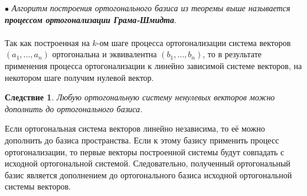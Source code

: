$\bullet$ \textit{Алгоритм построения ортогонального базиса из теоремы выше называется \textbf{процессом ортогонализации Грама-Шмидта}}.\\\\
Так как построенная на $k$-ом шаге процесса ортогонализации система векторов $(a_1,\dots,a_n)$ ортогональна и эквивалентна $(b_1, \dots, b_n)$, то в результате применения
процесса ортогонализации к линейно зависимой системе векторов, на некотором шаге получим нулевой вектор.
\newtheorem*{cor14_2_1}{Следствие}\begin{cor14_2_1}Любую ортогональную систему ненулевых векторов можно дополнить до ортогонального базиса.
\end{cor14_2_1}\begin{Proof}
	Если ортогональная система векторов линейно независима, то её можно дополнить до базиса пространства. Если к этому базису применить процесс ортогонализации, то первые векторы построенной системы будут совпадать с исходной ортогональной системой. Следовательно, полученный ортогональный базис является дополнением до ортогонального базиса исходной ортогональной системы векторов.
\end{Proof}











